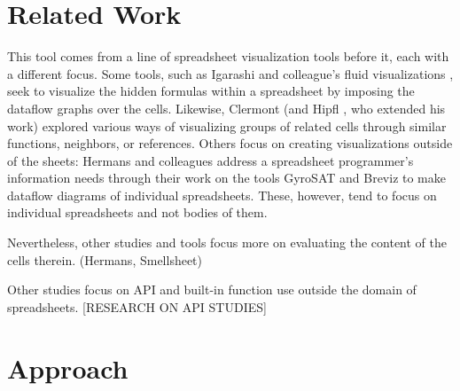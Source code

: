 \documentclass[conference]{IEEEtran}
\begin{document}
\section{Related Work}
This tool comes from a line of spreadsheet visualization tools before it, each with a different focus. Some tools, such as Igarashi and colleague's fluid visualizations \cite{igarashi1998fluid}, seek to visualize the hidden formulas within a spreadsheet by imposing the dataflow graphs over the cells. Likewise, Clermont \cite{clermont2003scalable} (and Hipfl \cite{hipfl2008using}, who extended his work) explored various ways of visualizing groups of related cells through similar functions, neighbors, or references. Others focus on creating visualizations outside of the sheets: Hermans and colleagues address a spreadsheet programmer's information needs through their work on the tools GyroSAT \cite{hermans2011supporting} and Breviz \cite{hermans2011breviz} to make dataflow diagrams of individual spreadsheets. These, however, tend to focus on individual spreadsheets and not bodies of them. \par
Nevertheless, other studies and tools focus more on evaluating the content of the cells therein. (Hermans, Smellsheet) \par
Other studies focus on API and built-in function use outside the domain of spreadsheets. [RESEARCH ON API STUDIES]  

\section{Approach}
\end{document}
